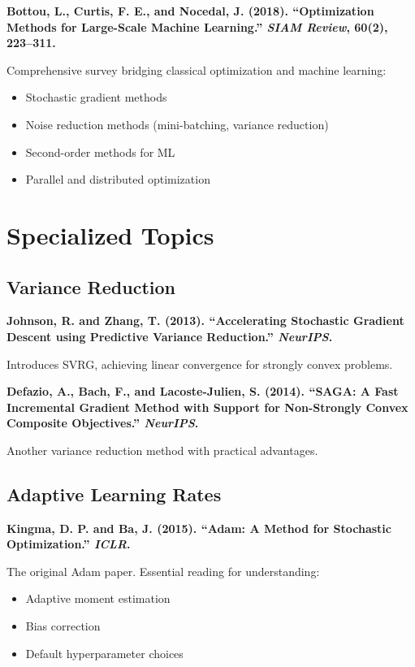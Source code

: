 \documentclass[../main.tex]{subfiles}
\begin{document}
\textbf{Bottou, L., Curtis, F. E., and Nocedal, J. (2018). ``Optimization Methods for Large-Scale Machine Learning.'' \emph{SIAM Review}, 60(2), 223--311.}

Comprehensive survey bridging classical optimization and machine learning:
\begin{itemize}
    \item Stochastic gradient methods
    \item Noise reduction methods (mini-batching, variance reduction)
    \item Second-order methods for ML
    \item Parallel and distributed optimization
\end{itemize}

\section{Specialized Topics}

\subsection{Variance Reduction}

\textbf{Johnson, R. and Zhang, T. (2013). ``Accelerating Stochastic Gradient Descent using Predictive Variance Reduction.'' \emph{NeurIPS}.}

Introduces SVRG, achieving linear convergence for strongly convex problems.

\textbf{Defazio, A., Bach, F., and Lacoste-Julien, S. (2014). ``SAGA: A Fast Incremental Gradient Method with Support for Non-Strongly Convex Composite Objectives.'' \emph{NeurIPS}.}

Another variance reduction method with practical advantages.

\subsection{Adaptive Learning Rates}

\textbf{Kingma, D. P. and Ba, J. (2015). ``Adam: A Method for Stochastic Optimization.'' \emph{ICLR}.}

The original Adam paper. Essential reading for understanding:
\begin{itemize}
    \item Adaptive moment estimation
    \item Bias correction
    \item Default hyperparameter choices
\end{itemize}
\end{document}
